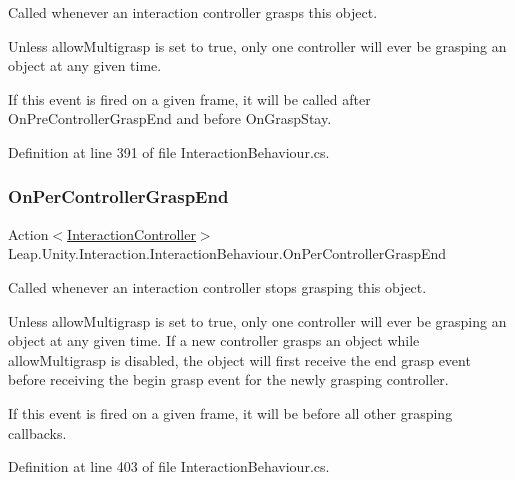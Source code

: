 Called whenever an interaction controller grasps this object. 

Unless allow\+Multigrasp is set to true, only one controller will ever be grasping an object at any given time. 

If this event is fired on a given frame, it will be called after On\+Pre\+Controller\+Grasp\+End and before On\+Grasp\+Stay. 

Definition at line 391 of file Interaction\+Behaviour.\+cs.

\mbox{\label{class_leap_1_1_unity_1_1_interaction_1_1_interaction_behaviour_a7517ff556c13b62dffe882003346b9f1}} 
\subsubsection{\texorpdfstring{OnPerControllerGraspEnd}{OnPerControllerGraspEnd}}
{\footnotesize\ttfamily Action$<$\mbox{\hyperlink{class_leap_1_1_unity_1_1_interaction_1_1_interaction_controller}{Interaction\+Controller}}$>$ Leap.\+Unity.\+Interaction.\+Interaction\+Behaviour.\+On\+Per\+Controller\+Grasp\+End}



Called whenever an interaction controller stops grasping this object. 

Unless allow\+Multigrasp is set to true, only one controller will ever be grasping an object at any given time. If a new controller grasps an object while allow\+Multigrasp is disabled, the object will first receive the end grasp event before receiving the begin grasp event for the newly grasping controller. 

If this event is fired on a given frame, it will be before all other grasping callbacks. 

Definition at line 403 of file Interaction\+Behaviour.\+cs.

\mbox{\label{class_leap_1_1_unity_1_1_interaction_1_1_interaction_behaviour_afc1d62d2f597a4f77522ba7f8577c75a}} 
